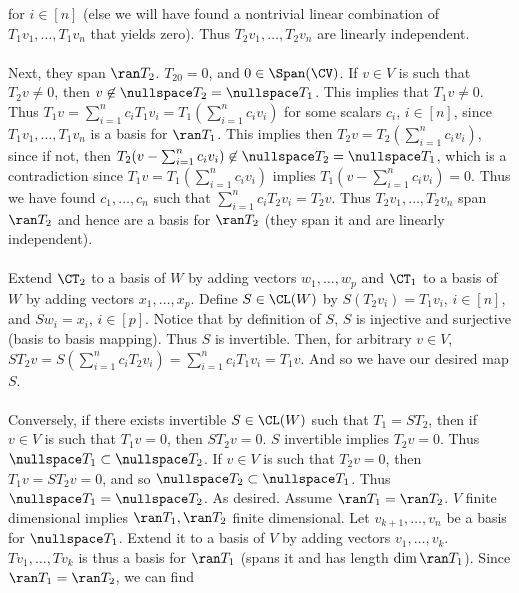 \documentclass{book}
\begin{document}
\begin{enumerate}[label=\arabic*)]
      for $i \in [n]$ (else we will have found a nontrivial linear combination of $T_1v_1, \dots, T_1v_n$ that yields zero). Thus $T_2v_1, \dots, T_2v_n$ are linearly independent. 
      \\~\\
      Next, they span $\ran T_2$. $T_20 = 0$, and $0 \in \Span(\CV)$. If $v \in V$ is such that $T_2v \neq 0$, then $v \not\in \nullspace T_2 = \nullspace T_1$. This implies that $T_1v \neq
      0$. Thus $T_1v = \sum_{i = 1}^{n}c_iT_1v_i = T_1(\sum_{i = 1}^{n}c_iv_i)$ for some scalars $c_i$, $i \in [n]$, since $T_1v_1, \dots, T_1v_n$ is a basis for $\ran T_1$. This implies
      then $T_2v = T_2(\sum_{i = 1}^{n}c_iv_i)$, since if not, then $T_2(v - \sum_{i = 1}^{n}c_iv_i) \not\in \nullspace T_2 = \nullspace T_1$, which is a contradiction since $T_1v =
      T_1(\sum_{i = 1}^{n}c_iv_i)$ implies $T_1(v - \sum_{i = 1}^{n}c_iv_i) = 0$. Thus we have found $c_1, \dots, c_n$ such that $\sum_{i = 1}^{n}c_iT_2v_i = T_2v$. Thus $T_2v_1, \dots,
      T_2v_n$ span $\ran T_2$ and hence are a basis for $\ran T_2$ (they span it and are linearly independent).
      \\~\\
      Extend $\CT_2$ to a basis of $W$ by adding vectors $w_1, \dots, w_p$ and $\CT_1$ to a basis of $W$ by adding vectors $x_1, \dots, x_p$. Define $S \in \CL(W)$ by $S(T_2v_i) = T_1v_i$,
      $i \in [n]$, and $Sw_i = x_i$, $i \in [p]$. Notice that by definition of $S$, $S$ is injective and surjective (basis to basis mapping). Thus $S$ is invertible. Then, for arbitrary $v
      \in V$, $ST_2v = S(\sum_{i = 1}^{n}c_iT_2v_i) = \sum_{i = 1}^{n}c_iT_1v_i = T_1v$. And so we have our desired map $S$.
      \\~\\
      Conversely, if there exists invertible $S \in \CL(W)$ such that $T_1 = ST_2$, then if $v \in V$ is such that $T_1v = 0$, then $ST_2v = 0$. $S$ invertible implies $T_2v = 0$. Thus
      $\nullspace T_1 \subset \nullspace T_2$. If $v \in V$ is such that $T_2v = 0$, then $T_1v = ST_2v = 0$, and so $\nullspace T_2 \subset \nullspace T_1$. Thus $\nullspace T_1 =
      \nullspace T_2$. As desired.
    \ii
      Assume $\ran T_1 = \ran T_2$. $V$ finite dimensional implies $\ran T_1, \ran T_2$ finite dimensional. Let $v_{k + 1}, \dots, v_n$ be a basis for $\nullspace T_1$. Extend it to a basis of
      $V$ by adding vectors $v_1, \dots, v_k$.  $Tv_1, \dots, Tv_k$ is thus a basis for $\ran T_1$ (spans it and has length $\dim\ran T_1$). Since $\ran T_1 = \ran T_2$, we can find

\end{enumerate}
\end{document}

